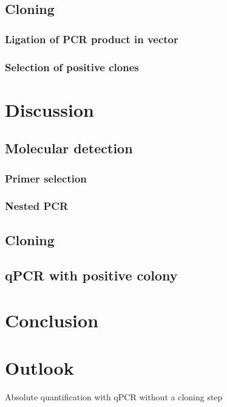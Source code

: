 \documentclass[a4paper]{article}
\begin{document}
\subsection{Cloning}
\subsubsection{Ligation of PCR product in vector}
\subsubsection{Selection of positive clones}


\pagebreak

\section{Discussion}
\subsection{Molecular detection}
\subsubsection{Primer selection}
\subsubsection{Nested PCR}
\subsection{Cloning}
\subsection{qPCR with positive colony}

\pagebreak

\section{Conclusion}


\pagebreak

\section{Outlook}
Absolute quantification with qPCR without a cloning step
\end{document}
